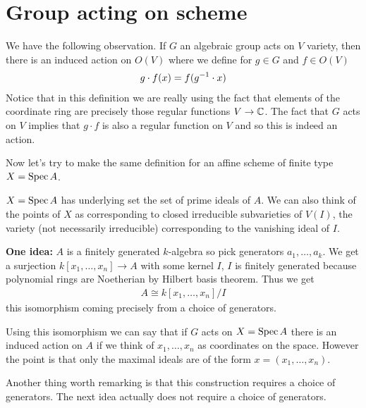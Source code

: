 \documentclass[12pt]{article}
\begin{document}
\section{Group acting on scheme}
We have the following observation. If $G$ an algebraic group acts on $V$ variety, then there is an induced action on $O(V)$ where we define for $g\in G$ and $f\in O(V)$ \begin{align*}
    g\cdot f(x) = f({g}^{-1}\cdot x)
\end{align*} Notice that in this definition we are really using the fact that elements of the coordinate ring are precisely those regular functions $V\to \mathbb{C}$. The fact that $G$ acts on $V$ implies that $g\cdot f$ is also a regular function on $V$ and so this is indeed an action.

\hfill

Now let's try to make the same definition for an affine scheme of finite type $X = \operatorname{Spec} A$. 

$X = \operatorname{Spec} A$ has underlying set the set of prime ideals of $A$. We can also think of the points of $X$ as corresponding to closed irreducible subvarieties of $V(I)$, the variety (not necessarily irreducible) corresponding to the vanishing ideal of $I$. 

\hfill

\textbf{One idea: }$A$ is a finitely generated $k$-algebra so pick generators $a_1,\dots,a_k$. We get a surjection $k[x_1,\dots,x_n]\to A$ with some kernel $I$, $I$ is finitely generated because polynomial rings are Noetherian by Hilbert basis theorem. Thus we get \begin{align*}
    A \cong k[x_1,\dots,x_n]/I
\end{align*} this isomorphism coming precisely from a choice of generators. 

Using this isomorphism we can say that if $G$ acts on $X = \operatorname{Spec} A$ there is an induced action on $A$ if we think of $x_1,\dots,x_n$ as coordinates on the space. However the point is that only the maximal ideals are of the form $x = (x_1,\dots,x_n)$. 

\hfill 

Another thing worth remarking is that this construction requires a choice of generators. The next idea actually does not require a choice of generators.
\end{document}
